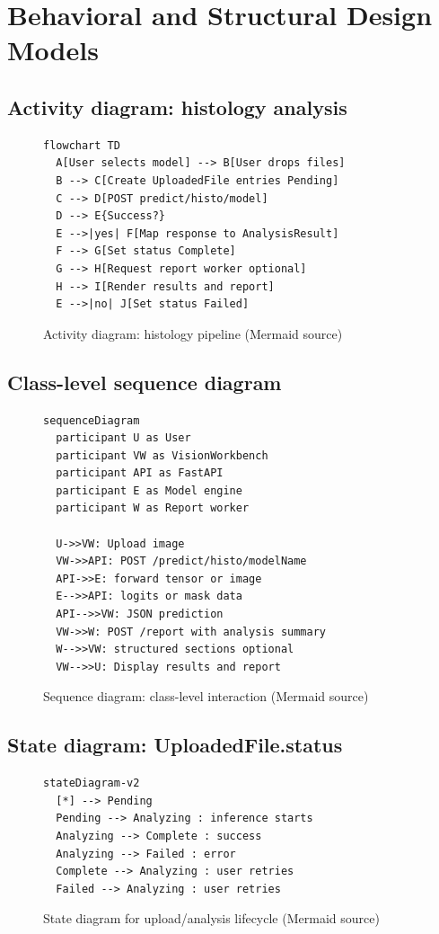 \documentclass[12pt,a4paper]{report}
\begin{document}
\section{Behavioral and Structural Design Models}
\label{sec:behavioral}

\subsection{Activity diagram: histology analysis}

\begin{figure}[htbp]
  \centering
  \begin{verbatim}
flowchart TD
  A[User selects model] --> B[User drops files]
  B --> C[Create UploadedFile entries Pending]
  C --> D[POST predict/histo/model]
  D --> E{Success?}
  E -->|yes| F[Map response to AnalysisResult]
  F --> G[Set status Complete]
  G --> H[Request report worker optional]
  H --> I[Render results and report]
  E -->|no| J[Set status Failed]
  \end{verbatim}
  \caption{Activity diagram: histology pipeline (Mermaid source)}
\end{figure}

\subsection{Class-level sequence diagram}

\begin{figure}[htbp]
  \centering
  \begin{verbatim}
sequenceDiagram
  participant U as User
  participant VW as VisionWorkbench
  participant API as FastAPI
  participant E as Model engine
  participant W as Report worker

  U->>VW: Upload image
  VW->>API: POST /predict/histo/modelName
  API->>E: forward tensor or image
  E-->>API: logits or mask data
  API-->>VW: JSON prediction
  VW->>W: POST /report with analysis summary
  W-->>VW: structured sections optional
  VW-->>U: Display results and report
  \end{verbatim}
  \caption{Sequence diagram: class-level interaction (Mermaid source)}
\end{figure}

\subsection{State diagram: UploadedFile.status}

\begin{figure}[htbp]
  \centering
  \begin{verbatim}
stateDiagram-v2
  [*] --> Pending
  Pending --> Analyzing : inference starts
  Analyzing --> Complete : success
  Analyzing --> Failed : error
  Complete --> Analyzing : user retries
  Failed --> Analyzing : user retries
  \end{verbatim}
  \caption{State diagram for upload/analysis lifecycle (Mermaid source)}
\end{figure}
\end{document}
